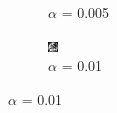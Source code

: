 \documentclass[11pt]{beamer}
\begin{document}
\begin{frame}
\begin{figure}[H]
\begin{subfigure}[h]{0.30\textwidth}
        \caption{$\alpha$ = 0.005}
        \label{fig:alpha = 0.005}
    \end{subfigure}%
    \hfill
    \begin{subfigure}[h]{0.3\textwidth} 
        \includegraphics[width=\textwidth]{img/tomo_ruido01.png}
        \caption{$\alpha$ = 0.01}
        \label{fig: alpha = 0.01}
    \end{subfigure}


	\end{figure}
\end{frame}

    
\end{document}
